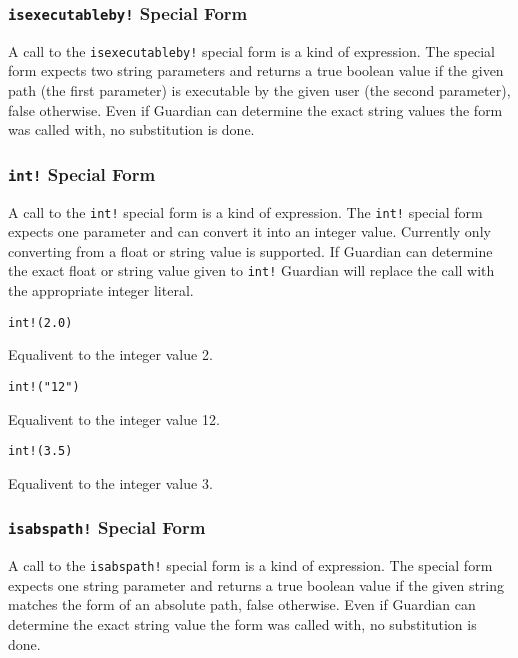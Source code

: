 {	\subsubsection{\lstinline[language=MAIA, columns=fixed]@isexecutableby!@ Special Form}
	{
		A call to the \lstinline[language=MAIA, columns=fixed]@isexecutableby!@ special form
		is a kind of expression.
		The special form expects two string parameters and returns a true boolean
		value if the given path (the first parameter) is executable by
		the given user (the second parameter), false
		otherwise.
		Even if Guardian can determine the exact string values the form was
		called with, no substitution is done.
	}

	\subsubsection{\lstinline[language=MAIA, columns=fixed]@int!@ Special Form}
	{
		A call to the \lstinline[language=MAIA, columns=fixed]@int!@ special form is a kind of expression.
		The \lstinline[language=MAIA, columns=fixed]@int!@ special form expects one parameter and can convert it
		into an integer value. Currently only converting from a float or string
		value is supported.
		If Guardian can determine the exact float or string value given to
		\lstinline[language=MAIA, columns=fixed]@int!@ Guardian will replace the call with the appropriate
		integer literal.
		
		\begin{itemize}
		{
			\item[] \lstinline[language=MAIA, columns=fixed]@int!(2.0)@
			
				Equalivent to the integer value 2.
			
			\item[] \lstinline[language=MAIA, columns=fixed]@int!("12")@
			
				Equalivent to the integer value 12.
			
			\item[] \lstinline[language=MAIA, columns=fixed]@int!(3.5)@
			
				Equalivent to the integer value 3.
		}
		\end{itemize}
	}
	
	\subsubsection{\lstinline[language=MAIA, columns=fixed]@isabspath!@ Special Form}
	{
		A call to the \lstinline[language=MAIA, columns=fixed]@isabspath!@ special form is a kind of expression.
		The special form expects one string parameter and returns a true boolean
		value if the given string matches the form of an absolute path, false
		otherwise.
		Even if Guardian can determine the exact string value the form was
		called with, no substitution is done.
		
}}
